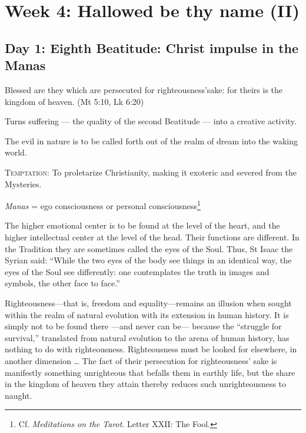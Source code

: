 \chapter{Week 4: Hallowed be thy name (II)}

\section{Day 1: Eighth Beatitude: Christ impulse in the Manas}

Blessed are they which are persecuted for righteousness'sake: for theirs is the kingdom of heaven.
(Mt 5:10, Lk 6:20)

Turns suffering — the quality of the second Beatitude — into a creative activity.

The evil in nature is to be called forth out of the realm of dream into the waking world.

\textsc{Temptation}: To proletarize Christianity, making it exoteric and severed from the Mysteries.

\emph{Manas} = ego consciousness or personal consciousness\footnote{Cf. \textit{Meditations on the Tarot}. Letter XXII: The Fool.}

\begin{quotationx}
The higher emotional center is to be found at the level of the heart, and the higher intellectual center at the level of the head. Their functions are different. In the Tradition they are sometimes called the eyes of the Soul. Thus, St Isaac the Syrian said: ``While the two eyes of the body see things in an identical way, the eyes of the Soul see differently: one contemplates the truth in images and symbols, the other face to face.''

Righteousness—that is, freedom and equality—remains an illusion when sought within the realm of natural evolution with its extension in human history. It is simply not to be found there —and never can be— because the ``struggle for survival,'' translated from natural evolution to the arena of human history, has nothing to do with righteousness. Righteousness must be looked for elsewhere, in another dimension … The fact of their persecution for righteousness' sake is manifestly something unrighteous that befalls them in earthly life, but the share in the kingdom of heaven they attain thereby reduces such unrighteousness to naught.

\end{quotationx}


